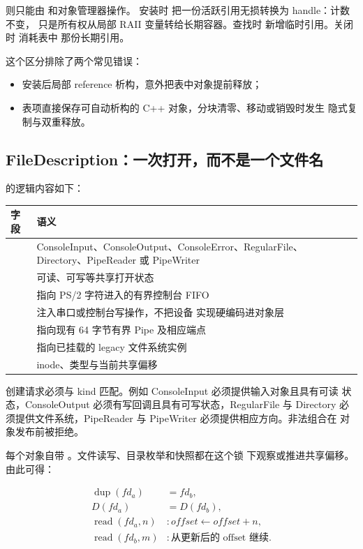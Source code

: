  则只能由  和对象管理器操作。
安装时  把一份活跃引用无损转换为 handle：计数不变，
只是所有权从局部 RAII 变量转给长期容器。查找时
 新增临时引用。关闭时  消耗表中
那份长期引用。

这个区分排除了两个常见错误：

\begin{itemize}
  \item 安装后局部 reference 析构，意外把表中对象提前释放；
  \item 表项直接保存可自动析构的 C++ 对象，分块清零、移动或销毁时发生
        隐式复制与双重释放。
\end{itemize}

\subsection{FileDescription：一次打开，而不是一个文件名}

 的逻辑内容如下：

\begin{longtable}{L{0.31\textwidth}L{0.57\textwidth}}
\toprule
字段 & 语义\\
\midrule
{} & ConsoleInput、ConsoleOutput、ConsoleError、RegularFile、
Directory、PipeReader 或 PipeWriter\\
 & 可读、可写等共享打开状态\\
 & 指向 PS/2 字符进入的有界控制台 FIFO\\
 & 注入串口或控制台写操作，不把设备
实现硬编码进对象层\\
 & 指向现有 64 字节有界 Pipe 及相应端点\\
 & 指向已挂载的 legacy 文件系统实例\\
 & inode、类型与当前共享偏移\\
\bottomrule
\end{longtable}

创建请求必须与 kind 匹配。例如 ConsoleInput 必须提供输入对象且具有可读
状态，ConsoleOutput 必须有写回调且具有可写状态，RegularFile 与 Directory
必须提供文件系统，PipeReader 与 PipeWriter 必须提供相应方向。非法组合在
对象发布前被拒绝。

每个对象自带 。文件读写、目录枚举和快照都在这个锁
下观察或推进共享偏移。由此可得：

\[
\begin{aligned}
\operatorname{dup}(fd_a) &= fd_b,\\
D(fd_a) &= D(fd_b),\\
\operatorname{read}(fd_a,n) &: offset \leftarrow offset+n,\\
\operatorname{read}(fd_b,m) &: \text{从更新后的 offset 继续}.
\end{aligned}
\]

